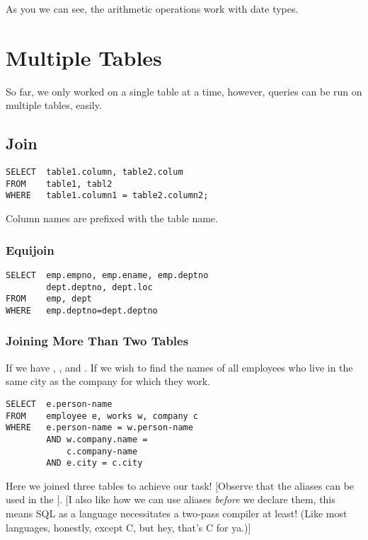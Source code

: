 \documentclass[11pt,a4paper,twocolumn]{book}
\begin{document}
As you we can see, the arithmetic operations work with date types.

\section{Multiple Tables}

So far, we only worked on a single table at a time, however, queries can be run on multiple tables, easily.

\subsection{Join}

\begin{lstlisting}
SELECT 	table1.column, table2.colum
FROM	table1, tabl2
WHERE	table1.column1 = table2.column2;
\end{lstlisting}

Column names are prefixed with the table name.

\subsubsection{Equijoin}

\begin{lstlisting}
SELECT 	emp.empno, emp.ename, emp.deptno
		dept.deptno, dept.loc
FROM	emp, dept
WHERE	emp.deptno=dept.deptno
\end{lstlisting}

\subsubsection{Joining More Than Two Tables}

If we have , ,  and . If we wish to find the names of all employees who live in the same city as the company for which they work.

\begin{lstlisting}
SELECT 	e.person-name
FROM	employee e, works w, company c
WHERE	e.person-name = w.person-name
		AND w.company.name = 
			c.company-name
		AND e.city = c.city
\end{lstlisting}

Here we joined three tables to achieve our task! [Observe that the aliases can be used in the ]. [I also like how we can use aliases \textit{before} we declare them, this means SQL as a language necessitates a two-pass compiler at least! (Like most languages, honestly, except C, but hey, that's C for ya.)]
\end{document}
